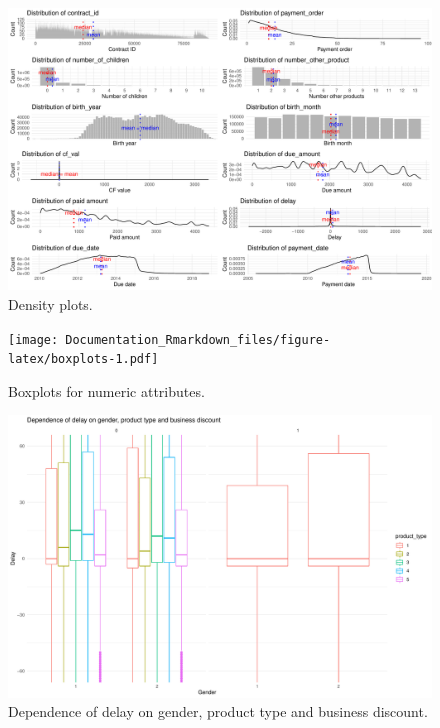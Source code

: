 \documentclass[
]{article}
\begin{document}
\begin{figure}
\centering
\includegraphics{Documentation_Rmarkdown_files/figure-latex/density-1.pdf}
\caption{\label{fig:density}\label{fig:density}Density plots.}
\end{figure}

\begin{figure}
\centering
\texttt{[image: Documentation\_Rmarkdown\_files/figure-latex/boxplots-1.pdf]}
\caption{\label{fig:boxplots}\label{fig:boxplots}Boxplots for numeric attributes.}
\end{figure}

\begin{figure}
\centering
\includegraphics{Documentation_Rmarkdown_files/figure-latex/delay-gender-prod-1.pdf}
\caption{\label{fig:delay-gender-prod}\label{fig:delay-gender-prod}Dependence of delay on gender, product type and business discount.}
\end{figure}
\end{document}
